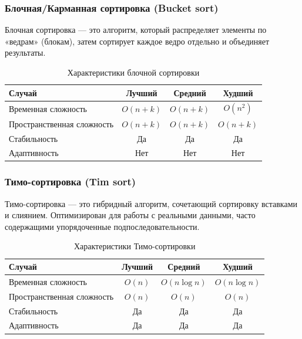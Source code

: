 \documentclass[a4paper,12pt]{article}
\begin{document}
\subsubsection{Блочная/Карманная сортировка (Bucket sort)}
\label{subsubsec:блочная-карманная-сортировка-bucket-sort}

Блочная сортировка --- это алгоритм, который распределяет элементы по «ведрам» (блокам), затем сортирует каждое ведро отдельно и объединяет результаты.

\begin{table}[H]
    \centering
    \begin{tabular}{|l|c|c|c|}
        \hline
        Случай & Лучший & Средний & Худший \\
        \hline
        Временная сложность & $O(n + k)$ & $O(n + k)$ & $O(n^2)$ \\
        \hline
        Пространственная сложность & $O(n + k)$ & $O(n + k)$ & $O(n + k)$ \\
        \hline
        Стабильность & Да & Да & Да \\
        \hline
        Адаптивность & Нет & Нет & Нет \\
        \hline
    \end{tabular}
    \caption{Характеристики блочной сортировки}
\end{table}

\subsubsection{Тимо-сортировка (Tim sort)}
\label{subsubsec:тимо-сортировка-tim-sort}

Тимо-сортировка --- это гибридный алгоритм, сочетающий сортировку вставками и слиянием. Оптимизирован для работы с реальными данными, часто содержащими упорядоченные подпоследовательности.

\begin{table}[H]
    \centering
    \begin{tabular}{|l|c|c|c|}
        \hline
        Случай & Лучший & Средний & Худший \\
        \hline
        Временная сложность & $O(n)$ & $O(n \log n)$ & $O(n \log n)$ \\
        \hline
        Пространственная сложность & $O(n)$ & $O(n)$ & $O(n)$ \\
        \hline
        Стабильность & Да & Да & Да \\
        \hline
        Адаптивность & Да & Да & Да \\
        \hline
    \end{tabular}
    \caption{Характеристики Тимо-сортировки}
\end{table}
\end{document}
